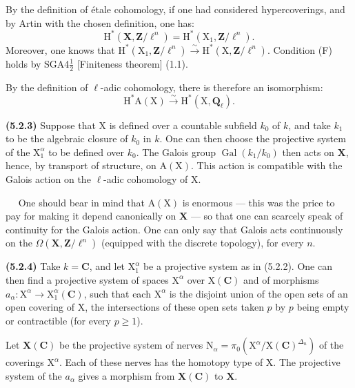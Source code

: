 \documentclass[11pt,leqno]{article}
\newcommand{\Page}[1]{\ifvmode\noindent\else\unskip\ \fi{\footnotesize\textcolor{gray}{[p.\,#1]}}\ \ignorespaces}
\begin{document}
By the definition of étale cohomology, if one had considered hypercoverings, and by Artin with the chosen definition, one has:
\[
\mathrm{H}^*(\mathbf{X},\mathbf{Z}/\ell^n)
=\mathrm{H}^*(\mathrm{X}_1,\mathbf{Z}/\ell^n).
\]
Moreover, one knows that \(\mathrm{H}^*(\mathrm{X}_1,\mathbf{Z}/\ell^n)\xrightarrow{\sim}\mathrm{H}^*(\mathrm{X},\mathbf{Z}/\ell^n)\). Condition (F) holds by SGA4\(\frac{1}{2}\) [Finiteness theorem] (1.1).

By the definition of \(\ell\)-adic cohomology, there is therefore an isomorphism:
\[
\mathrm{H}^*\mathrm{A}(\mathrm{X})
\xrightarrow{\sim}
\mathrm{H}^*(\mathrm{X},\mathbf{Q}_{\ell}).
\]

\textbf{(5.2.3)} Suppose that \(\mathrm{X}\) is defined over a countable subfield \(k_0\) of \(k\), and take \(k_1\) to be the algebraic closure of \(k_0\) in \(k\). One can then choose the projective system of the \(\mathrm{X}_1^{\alpha}\) to be defined over \(k_0\). The Galois group \(\operatorname{Gal}(k_1/k_0)\) then acts on \(\mathbf{X}\), hence, by transport of structure, on \(\mathrm{A}(\mathrm{X})\). This action is compatible with the Galois action on the \(\ell\)-adic cohomology of \(\mathrm{X}\).

\Page{239}
One should bear in mind that \(\mathrm{A}(\mathrm{X})\) is enormous — this was the price to pay for making it depend canonically on \(\mathbf{X}\) — so that one can scarcely speak of continuity for the Galois action. One can only say that Galois acts continuously on the \(\Omega(\mathbf{X},\mathbf{Z}/\ell^n)\) (equipped with the discrete topology), for every \(n\).

\textbf{(5.2.4)} Take \(k=\mathbf{C}\), and let \(\mathrm{X}_1^{\alpha}\) be a projective system as in (5.2.2). One can then find a projective system of spaces \(\mathrm{X}^{\alpha}\) over \(\mathrm{X}(\mathbf{C})\) and of morphisms \(a_{\alpha}:\mathrm{X}^{\alpha}\to\mathrm{X}_1^{\alpha}(\mathbf{C})\), such that each \(\mathrm{X}^{\alpha}\) is the disjoint union of the open sets of an open covering of \(\mathrm{X}\), the intersections of these open sets taken \(p\) by \(p\) being empty or contractible (for every \(p\geq1\)).

Let \(\mathbf{X}(\mathbf{C})\) be the projective system of nerves \(\mathrm{N}_{\alpha}=\pi_0(\mathrm{X}^{\alpha}/\mathrm{X}(\mathbf{C})^{\Delta_n})\) of the coverings \(\mathrm{X}^{\alpha}\). Each of these nerves has the homotopy type of \(\mathrm{X}\). The projective system of the \(a_{\alpha}\) gives a morphism from \(\mathbf{X}(\mathbf{C})\) to \(\mathbf{X}\).
\end{document}
